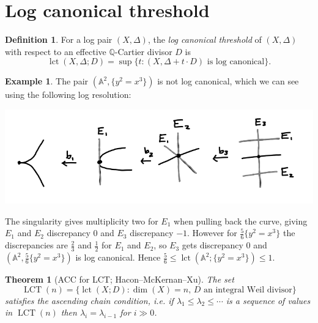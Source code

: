 \documentclass{article}
\newtheorem*{theorem}{Theorem}
\theoremstyle{definition}
\newtheorem*{definition}{Definition}
\newtheorem*{example}{Example}
\DeclareMathOperator{\lct}{lct}
\DeclareMathOperator{\LCT}{LCT}
\newcommand{\A}{\mathbb{A}}
\newcommand{\Q}{\mathbb{Q}}
\begin{document}
\section*{Log canonical threshold}

\begin{definition}
    For a log pair $(X,\Delta)$, the \emph{log canonical threshold} of $(X,\Delta)$
    with respect to an effective $\Q$-Cartier divisor $D$ is
    \begin{equation*}
        \lct(X,\Delta;D) = \sup\{t:\text{$(X,\Delta+t\cdot D)$ is log canonical}\}.
    \end{equation*}
\end{definition}

\begin{example}
    The pair $(\A^2,\{y^2=x^3\})$ is not log canonical, which we can see using
    the following log resolution:
    \begin{center}
        \includegraphics[scale=0.6]{log_resolution}
    \end{center}
    The singularity gives multiplicity two for $E_1$ when pulling back the
    curve, giving $E_1$ and $E_2$ discrepancy 0 and $E_3$ discrepancy $-1$.
    However for $\frac{5}{6}\{y^2=x^3\}$ the discrepancies are $\frac{2}{3}$ and
    $\frac{1}{2}$ for $E_1$ and $E_2$, so $E_3$ gets discrepancy 0 and
    $(\A^2,\frac{5}{6}\{y^2=x^3\})$ is log canonical. Hence
    $\frac{5}{6}\le\lct(\A^2;\{y^2=x^3\})\le1$.
\end{example}

\begin{theorem}[ACC for LCT; Hacon--McKernan--Xu]
    The set
    \begin{equation*}
        \LCT(n) = \{\lct(X;D)
            :\text{$\dim(X)=n$, $D$ an integral Weil divisor}\}
    \end{equation*}
    satisfies the ascending chain condition, i.e. if
    $\lambda_1\le\lambda_2\le\cdots$ is a sequence of values in $\LCT(n)$ then
    $\lambda_i=\lambda_{i-1}$ for $i\gg0$.
\end{theorem}
\end{document}

